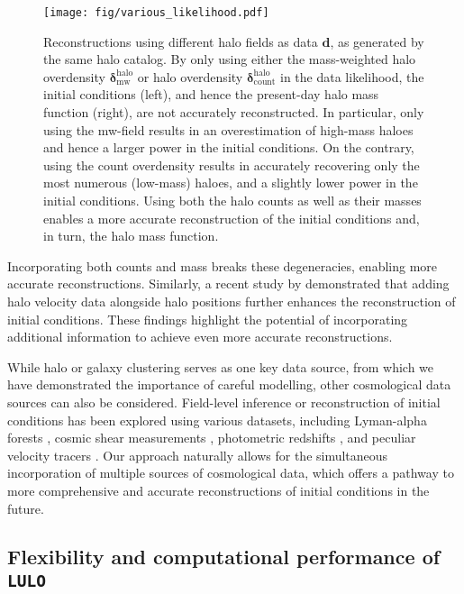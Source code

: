 \begin{figure*}
    \centering
    \texttt{[image: fig/various\_likelihood.pdf]}
    \vspace{-0.65em}
    \caption{Reconstructions using different halo fields as data $\mathbf{d}$, as generated by the same halo catalog. By only using either the mass-weighted halo overdensity $\boldsymbol{\delta}_{\mathrm{mw}}^{\mathrm{halo}}$ or halo overdensity $\boldsymbol{\delta}_{\mathrm{count}}^{\mathrm{halo}}$ in the data likelihood, the initial conditions (left), and hence the present-day halo mass function (right), are not accurately reconstructed. In particular, only using the mw-field results in an overestimation of high-mass haloes and hence a larger power in the initial conditions. On the contrary, using the count overdensity results in accurately recovering only the most numerous (low-mass) haloes, and a slightly lower power in the initial conditions. Using both the halo counts as well as their masses enables a more accurate reconstruction of the initial conditions and, in turn, the halo mass function.}
    \label{fig:mw_vs_nw}
\end{figure*}

Incorporating both counts and mass breaks these degeneracies, enabling more accurate reconstructions. Similarly, a recent study by \citet{Bayer2023b} demonstrated that adding halo velocity data alongside halo positions further enhances the reconstruction of initial conditions. These findings highlight the potential of incorporating additional information to achieve even more accurate reconstructions. 

While halo or galaxy clustering serves as one key data source, from which we have demonstrated the importance of careful modelling, other cosmological data sources can also be considered. Field-level inference or reconstruction of initial conditions has been explored using various datasets, including Lyman-alpha forests \citep{Horowitz2019,Horowitz2022,Porqueres2020,Porqueres2021}, cosmic shear measurements \citep{Porqueres2021,Porqueres2022,Porqueres2023}, photometric redshifts \citep{Tsaprazi2023}, and peculiar velocity tracers \citep{Prideaux-Ghee2022}. Our approach naturally allows for the simultaneous incorporation of multiple sources of cosmological data, which offers a pathway to more comprehensive and accurate reconstructions of initial conditions in the future.

\subsection{Flexibility and computational performance of \texttt{LULO}}
\label{sec:compcost}

